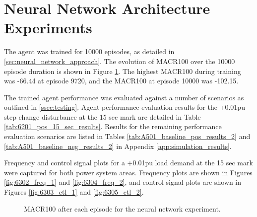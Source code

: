 \section{Neural Network Architecture Experiments}
The agent was trained for 10000 episodes, as detailed in \textsection \ref{sec:neural_network_approach}. The evolution of MACR100 over the 10000 episode duration is shown in Figure \ref{fig:6301_average_reward}. The highest MACR100 during training was -66.44 at episode 9720, and the MACR100 at episode 10000 was -102.15.

The trained agent performance was evaluated against a number of scenarios as outlined in \textsection \ref{ssec:testing}. Agent performance evaluation results for the +0.01pu step change disturbance at the 15 sec mark are detailed in Table \ref{tab:6201_pos_15_sec_results}. Results for the remaining performance evaluation scenarios are listed in Tables \ref{tab:A501_baseline_pos_results_2} and \ref{tab:A501_baseline_neg_results_2} in Appendix \ref{app:simulation_results}.

Frequency and control signal plots for a +0.01pu load demand at the 15 sec mark were captured for both power system areas. Frequency plots are shown in Figures \ref{fig:6302_freq_1} and \ref{fig:6304_freq_2}, and control signal plots are shown in Figures \ref{fig:6303_ctl_1} and \ref{fig:6305_ctl_2}.

\begin{figure}[h]
	\centering
	
	\caption{MACR100 after each episode for the neural network experiment.}\label{fig:6301_average_reward}
\end{figure}



